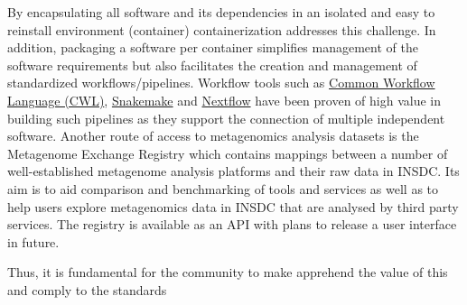 By encapsulating all software and its dependencies in an isolated and easy to reinstall environment (container) containerization addresses this challenge. In addition, packaging a software per container simplifies management of the software requirements but also facilitates the creation and management of standardized workflows/pipelines. Workflow tools such as 
\href{https://github.com/common-workflow-language/common-workflow-language}{Common Workflow Language (CWL)}, 
\href{https://snakemake.github.io}{Snakemake} and \href{https://www.nextflow.io}{Nextflow} have been proven of high value in building such pipelines as they support the connection of multiple independent software.
Another route of access to metagenomics analysis datasets is the Metagenome Exchange Registry which contains mappings between a number of well-established metagenome analysis platforms and their raw data in INSDC. Its aim is to aid comparison and benchmarking of tools and services as well as to help users explore metagenomics data in INSDC that are analysed by third party services. The registry is available as an API with plans to release a user interface in future.





Thus, it is fundamental for the community to make apprehend the value of 
this and comply to the standards~\cite{}

